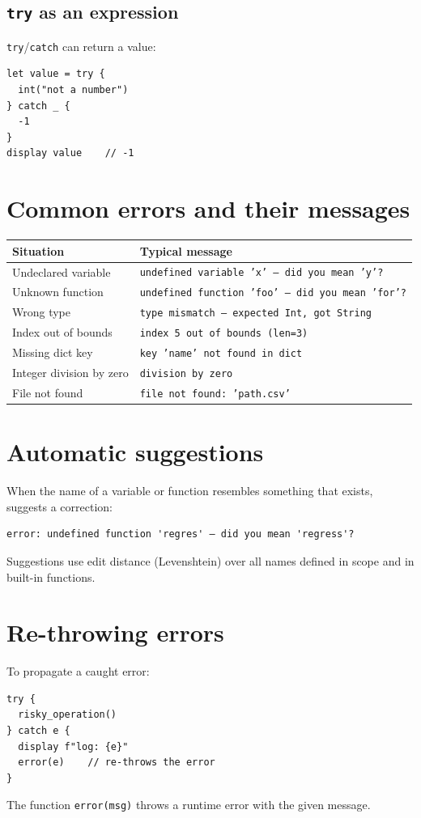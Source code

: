 \subsection*{\texttt{try} as an expression}

\lstinline{try}/\lstinline{catch} can return a value:

\begin{lstlisting}
let value = try {
  int("not a number")
} catch _ {
  -1
}
display value    // -1
\end{lstlisting}

\section{Common errors and their messages}

\begin{center}
\begin{tabular}{ll}
\toprule
\textbf{Situation} & \textbf{Typical message} \\
\midrule
Undeclared variable   & \texttt{undefined variable 'x' — did you mean 'y'?} \\
Unknown function      & \texttt{undefined function 'foo' — did you mean 'for'?} \\
Wrong type            & \texttt{type mismatch — expected Int, got String} \\
Index out of bounds   & \texttt{index 5 out of bounds (len=3)} \\
Missing dict key      & \texttt{key 'name' not found in dict} \\
Integer division by zero & \texttt{division by zero} \\
File not found        & \texttt{file not found: 'path.csv'} \\
\bottomrule
\end{tabular}
\end{center}

\section{Automatic suggestions}

When the name of a variable or function resembles something that exists,
\hayashi{} suggests a correction:

\begin{lstlisting}[style=inline]
error: undefined function 'regres' — did you mean 'regress'?
\end{lstlisting}

Suggestions use edit distance (Levenshtein) over all names defined in scope
and in built-in functions.

\section{Re-throwing errors}

To propagate a caught error:

\begin{lstlisting}
try {
  risky_operation()
} catch e {
  display f"log: {e}"
  error(e)    // re-throws the error
}
\end{lstlisting}

The function \lstinline{error(msg)} throws a runtime error with the given
message.
